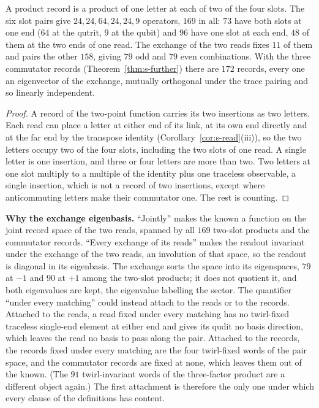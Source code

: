 \begin{corollary}
\label{cor:s-records}
A product record is a product of one letter at each of two of the four slots. The six slot pairs give $24,24,64,24,24,9$ operators, $169$ in all: $73$ have both slots at one end ($64$ at the qutrit, $9$ at the qubit) and $96$ have one slot at each end, $48$ of them at the two ends of one read. The exchange of the two reads fixes $11$ of them and pairs the other $158$, giving $79$ odd and $79$ even combinations. With the three commutator records (Theorem~\ref{thm:s-further}) there are $172$ records, every one an eigenvector of the exchange, mutually orthogonal under the trace pairing and so linearly independent.
\end{corollary}
\begin{proof}
A record of the two-point function carries its two insertions as two letters. Each read can place a letter at either end of its link, at its own end directly and at the far end by the transpose identity (Corollary~\ref{cor:s-read}(iii)), so the two letters occupy two of the four slots, including the two slots of one read. A single letter is one insertion, and three or four letters are more than two. Two letters at one slot multiply to a multiple of the identity plus one traceless observable, a single insertion, which is not a record of two insertions, except where anticommuting letters make their commutator one. The rest is counting.
\end{proof}

\textbf{Why the exchange eigenbasis.} ``Jointly'' makes the known a function on the joint record space of the two reads, spanned by all $169$ two-slot products and the commutator records. ``Every exchange of its reads'' makes the readout invariant under the exchange of the two reads, an involution of that space, so the readout is diagonal in its eigenbasis. The exchange sorts the space into its eigenspaces, $79$ at $-1$ and $90$ at $+1$ among the two-slot products; it does not quotient it, and both eigenvalues are kept, the eigenvalue labelling the sector. The quantifier ``under every matching'' could instead attach to the reads or to the records. Attached to the reads, a read fixed under every matching has no twirl-fixed traceless single-end element at either end and gives its qudit no basis direction, which leaves the read no basis to pass along the pair. Attached to the records, the records fixed under every matching are the four twirl-fixed words of the pair space, and the commutator records are fixed at none, which leaves them out of the known. (The $91$ twirl-invariant words of the three-factor product are a different object again.) The first attachment is therefore the only one under which every clause of the definitions has content.

